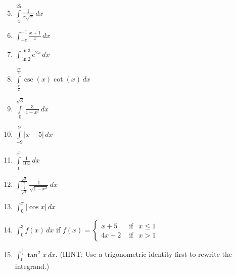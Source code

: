 \documentclass[12pt]{article}
\newif\ifans
\begin{document}
\begin{enumerate}
\setcounter{enumi}{4}

\item $\int\limits_{4}^{25} \frac{1}{x\sqrt{x}}\,dx$ 

\ifans{\fbox{$\frac{3}{5}$}} \fi

\item $\int_{-e}^{-1}{\frac{x+1}{x}} \,dx$

\ifans{\fbox{$-2+e$}} \fi

\item $\int_{\ln{2}}^{\ln{3}}e^{2x} \,dx$

\ifans{\fbox{$\frac{5}{2}$}} \fi

\item $\int\limits_{\frac{\pi}{2}}^{\frac{2\pi}{3}}\csc{(x)}\cot{(x)}\,dx$ 

\ifans{\fbox{$1-\frac{2}{\sqrt{3}}$}} \fi

\item $\int\limits_{0}^{\sqrt{3}}\frac{3}{1+x^2}\,dx$ 

\ifans{\fbox{$\pi$}} \fi

\item $\int\limits_{-9}^{9}|x-5|\,dx$ 

\ifans{\fbox{106}} \fi

\item $\int\limits^{e^{6}}_{1}\frac{1}{10 x}\,dx$ 

\ifans{\fbox{$\frac{3}{5}$}} \fi

\item $\int_{\frac{1}{\sqrt{2}}}^{\frac{\sqrt{3}}{2}} \frac{1}{\sqrt{1-x^2}} \,dx$ 

\ifans{\fbox{$\frac{\pi}{12}$}} \fi

\item $\int_{0}^{\pi} |\cos{x}| \,dx$

\ifans{\fbox{2}} \fi

\item $\int_0^3 f(x) \,dx$ if $f(x)=\left\{\begin{array}{lll}
x+5 & \text{  if} & x \leq 1\\
4x+2 & \text{  if} & x > 1
\end{array}\right.$

\ifans{\fbox{$\frac{47}{2}$}} \fi

\item $\int_0^{\frac{\pi}{4}} \tan^2{x} \,dx$.  (HINT: Use a trigonometric identity first to rewrite the integrand.)

\ifans{\fbox{$1-\frac{\pi}{4}$}} \fi


\end{enumerate}
\end{document}
